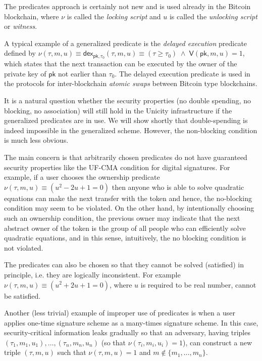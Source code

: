 \documentclass{article}
\newcommand{\sigver}[0]{\mathsf{V}}
\newcommand{\pubkey}[0]{\mathsf{pk}}
\newcommand{\predi}[0]{\nu}
\newcommand{\systime}[0]{\tau}
\begin{document}
The predicates approach is certainly not new and is used already in the Bitcoin blockchain, where $\predi$ is called the \emph{locking script} and $u$ is called the \emph{unlocking script} or \emph{witness}.

A typical example of a generalized predicate is the \emph{delayed execution} predicate defined by $\predi(\systime,m,u)\equiv \mathsf{dex}_{\pubkey,\tau_0}(\systime,m,u) \equiv (\systime\ge\tau_0)\;\wedge\; \sigver(\pubkey,m,u)=1$, which states that the next transaction can be executed by the owner of the private key of $\pubkey$ not earlier than $\tau_0$. The delayed execution predicate is used in the protocols for inter-blockchain \emph{atomic swaps} between Bitcoin type blockchains.

It is a natural question whether the security properties (no double spending, no blocking, no association) will still hold in the Unicity infrastructure if the generalized predicates are in use. We will show shortly that double-spending is indeed impossible in the generalized scheme. However, the non-blocking condition is much less obvious.

The main concern is that arbitrarily chosen predicates do not have guaranteed security properties like the UF-CMA condition for digital signatures. For example, if a user chooses the ownership predicate $\predi(\systime,m,u)\equiv (u^2 - 2u + 1=0)$ then anyone who is able to solve quadratic equations can make the next transfer with the token and hence, the no-blocking condition may seem to be violated. On the other hand, by intentionally choosing such an ownership condition, the previous owner may indicate that the next abstract owner of the token is the group of all people who can efficiently solve quadratic equations, and in this sense, intuitively, the no blocking condition is not violated.

The predicates can also be chosen so that they cannot be solved (satisfied) in principle, i.e. they are logically inconsistent. For example
$\predi(\systime,m,u)\equiv (u^2 + 2u + 1=0)$, where $u$
is required to be real number, cannot be satisfied.

Another (less trivial) example of improper use of predicates is when a user applies one-time signature scheme as a many-times signature scheme. In this case, security-critical information leaks gradually so that an adversary, having triples
$(\systime_1,m_1,u_1),\ldots,(\systime_n,m_n,u_n)$ (so that $\predi(\systime_i,m_i,u_i)=1$), can construct a new triple $(\systime,m,u)$ such that $\predi(\systime,m,u)=1$ and $m\not\in\{m_1,\ldots,m_n\}$.
\end{document}
